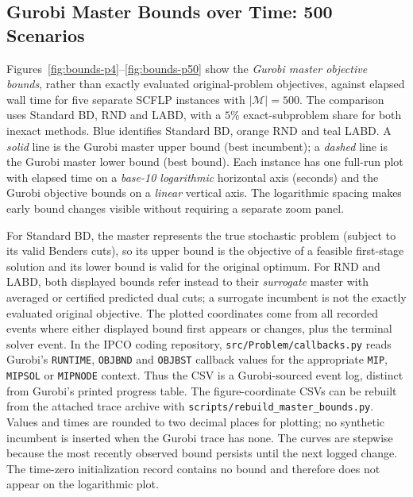 \subsection{Gurobi Master Bounds over Time: 500 Scenarios}\label{app:lbub}

Figures~\ref{fig:bounds-p4}--\ref{fig:bounds-p50} show the \emph{Gurobi master objective bounds}, rather than exactly evaluated original-problem objectives, against elapsed wall time for five separate SCFLP instances with $|\mathcal M|=500$. The comparison uses Standard BD, RND and LABD, with a $5\%$ exact-subproblem share for both inexact methods. Blue identifies Standard BD, orange RND and teal LABD. A \emph{solid} line is the Gurobi master upper bound (best incumbent); a \emph{dashed} line is the Gurobi master lower bound (best bound). Each instance has one full-run plot with elapsed time on a \emph{base-10 logarithmic} horizontal axis (seconds) and the Gurobi objective bounds on a \emph{linear} vertical axis. The logarithmic spacing makes early bound changes visible without requiring a separate zoom panel.

For Standard BD, the master represents the true stochastic problem (subject to its valid Benders cuts), so its upper bound is the objective of a feasible first-stage solution and its lower bound is valid for the original optimum. For RND and LABD, both displayed bounds refer instead to their \emph{surrogate} master with averaged or certified predicted dual cuts; a surrogate incumbent is not the exactly evaluated original objective. The plotted coordinates come from all recorded events where either displayed bound first appears or changes, plus the terminal solver event. In the IPCO coding repository, \texttt{src/Problem/callbacks.py} reads Gurobi's \texttt{RUNTIME}, \texttt{OBJBND} and \texttt{OBJBST} callback values for the appropriate \texttt{MIP}, \texttt{MIPSOL} or \texttt{MIPNODE} context. Thus the CSV is a Gurobi-sourced event log, distinct from Gurobi's printed progress table. The figure-coordinate CSVs can be rebuilt from the attached trace archive with \texttt{scripts/rebuild\_master\_bounds.py}. Values and times are rounded to two decimal places for plotting; no synthetic incumbent is inserted when the Gurobi trace has none. The curves are stepwise because the most recently observed bound persists until the next logged change. The time-zero initialization record contains no bound and therefore does not appear on the logarithmic plot.



